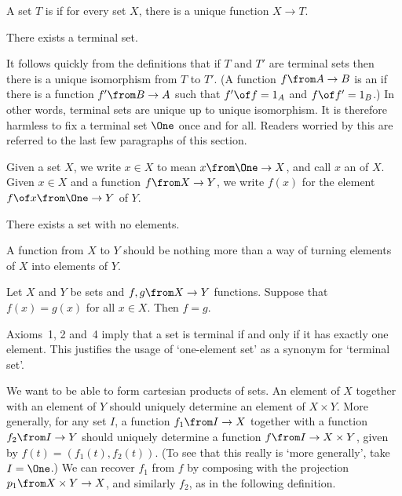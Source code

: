 \documentclass[12pt]{article}
\begin{document}
\begin{dfn}
A set $T$ is  if for every set $X$, there is a unique
function $X \to T$.
\end{dfn}

\begin{axiom}
There exists a terminal set.
\end{axiom}
It follows quickly from the definitions that if $T$ and $T'$ are terminal
sets then there is a unique isomorphism from $T$ to $T'$.  (A function $f
\from A \to B$ is an  if there is a function $f' \from B
\to A$ such that $f' \of f = 1_A$ and $f \of f' = 1_B$.)  In other words,
terminal sets are unique up to unique isomorphism.  It is therefore
harmless to fix a terminal set $\One$ once and for all.  Readers worried by
this are referred to the last few paragraphs of this section.

\begin{dfn}
Given a set $X$, we write $x \in X$ to mean $x\from \One \to X$, and call
$x$ an  of $X$.  Given $x \in X$ and a function $f\from X
\to Y$, we write $f(x)$ for the element $f \of x\from \One \to Y$ of
$Y$. 
\end{dfn}



\begin{axiom}
There exists a set with no elements.
\end{axiom}

% 
A function from $X$ to $Y$ should be nothing more than a way of turning
elements of $X$ into elements of $Y$.  

\begin{axiom}
Let $X$ and $Y$ be sets and $f, g\from X \to Y$ functions.  Suppose that
$f(x) = g(x)$ for all $x \in X$.  Then $f = g$.
\end{axiom}
Axioms~1, 2 and~4 imply that a set is terminal if and only if it has
exactly one element.  This justifies the usage of `one-element set' as a
synonym for `terminal set'.


% 
We want to be able to form cartesian products of sets.  An element of $X$
together with an element of $Y$ should uniquely determine an element of $X
\times Y$.  More generally, for any set $I$, a function $f_1 \from I \to X$
together with a function $f_2 \from I \to Y$ should uniquely determine a
function $f \from I \to X \times Y$, given by $f(t) = (f_1(t),
f_2(t))$.  (To see that this really is `more generally', take $I =
\One$.)  We can recover $f_1$ from $f$ by composing with the projection
$p_1 \from X \times Y \to X$, and similarly $f_2$, as in the following
definition. 
\end{document}
